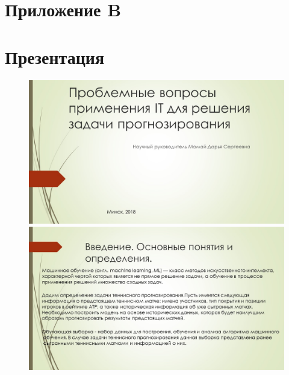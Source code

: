 \newpage
\section*{Приложение B}
\section*{Презентация}
\begin{figure}[h]
	\includegraphics[scale=0.5]{images/1.JPG}
	\includegraphics[scale=0.5]{images/2.JPG}
\end{figure}
